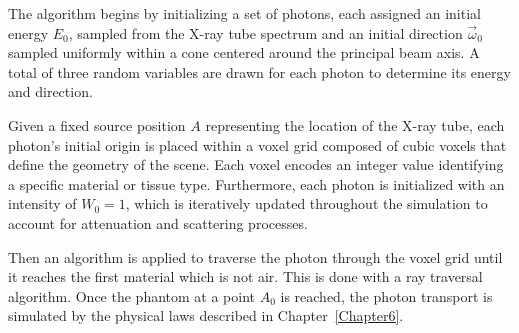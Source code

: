 The algorithm begins by initializing a set of photons, each assigned an initial
energy $E_0$, sampled from the X-ray tube spectrum and an initial direction
$\vec{\omega}_0$ sampled uniformly within a cone centered around the principal
beam axis. A total of three random variables are drawn for each photon to
determine its energy and direction.

Given a fixed source position $A$ representing the location of the X-ray tube,
each photon's initial origin is placed within a voxel grid composed of cubic
voxels that define the geometry of the scene. Each voxel encodes an integer
value identifying a specific material or tissue type. Furthermore, each photon
is initialized with an intensity of $W_0=1$, which is iteratively updated
throughout the simulation to account for attenuation and scattering processes.

\begin{figure}[H]
    \centering
\end{figure}

Then an algorithm is applied to traverse the photon through the voxel grid until
it reaches the first material which is not air. This is done with a ray
traversal algorithm. Once the phantom at a point $A_0$ is reached, the photon
transport is simulated by the physical laws described in Chapter~\ref{Chapter6}.

